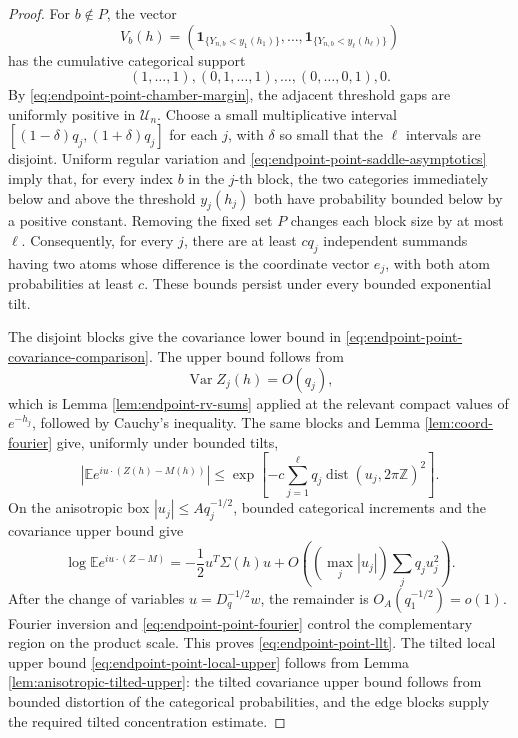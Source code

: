 \documentclass[11pt]{article}
\theoremstyle{remark}
\newcommand{\Ee}{\mathbb E}
\newcommand{\one}{\mathbf 1}
\newcommand{\Var}{\operatorname{Var}}
\begin{document}
\begin{proof}
For $b\notin P$, the vector
\[
        V_b(h)=
        (\one_{\{Y_{n,b}<y_1(h_1)\}},\ldots,
         \one_{\{Y_{n,b}<y_\ell(h_\ell)\}})
\]
has the cumulative categorical support
\[
        (1,\ldots,1),(0,1,\ldots,1),\ldots,
        (0,\ldots,0,1),0.
\]
By \eqref{eq:endpoint-point-chamber-margin}, the adjacent threshold gaps are
uniformly positive in $\mathcal U_n$.  Choose a small multiplicative interval
$[(1-\delta)q_j,(1+\delta)q_j]$ for each $j$, with $\delta$ so small that the
$\ell$ intervals are disjoint.  Uniform regular variation and
\eqref{eq:endpoint-point-saddle-asymptotics} imply that, for every index $b$ in
the $j$-th block, the two categories immediately below and above the threshold
$y_j(h_j)$ both have probability bounded below by a positive constant.
Removing the fixed set $P$ changes each block size by at most $\ell$.
Consequently, for every $j$, there are at least $cq_j$ independent summands
having two atoms whose difference is the coordinate vector $e_j$, with both
atom probabilities at least $c$.  These bounds persist under every bounded
exponential tilt.

The disjoint blocks give the covariance lower bound in
\eqref{eq:endpoint-point-covariance-comparison}.  The upper bound follows from
\[
        \Var Z_j(h)=O(q_j),
\]
which is Lemma \ref{lem:endpoint-rv-sums} applied at the relevant compact
values of $e^{-h_j}$, followed by Cauchy's inequality.  The same blocks and
Lemma \ref{lem:coord-fourier} give, uniformly under bounded tilts,
\[
\left|\Ee e^{iu\cdot(Z(h)-M(h))}\right|
\le\exp\left[-c\sum_{j=1}^\ell
q_j\operatorname{dist}(u_j,2\pi\mathbb Z)^2\right].
\tag{10.14}\label{eq:endpoint-point-fourier}
\]
On the anisotropic box $|u_j|\le A q_j^{-1/2}$, bounded categorical
increments and the covariance upper bound give
\[
\log\Ee e^{iu\cdot(Z-M)}
=-\frac12u^T\Sigma(h)u
+O\left((\max_j|u_j|)\sum_jq_ju_j^2\right).
\]
After the change of variables $u=D_q^{-1/2}w$, the remainder is
$O_A(q_1^{-1/2})=o(1)$.  Fourier inversion and
\eqref{eq:endpoint-point-fourier} control the complementary region on the
product scale.  This proves \eqref{eq:endpoint-point-llt}.  The tilted local
upper bound \eqref{eq:endpoint-point-local-upper} follows from Lemma
\ref{lem:anisotropic-tilted-upper}: the tilted covariance upper bound follows
from bounded distortion of the categorical probabilities, and the edge blocks
supply the required tilted concentration estimate.
\end{proof}
\end{document}

